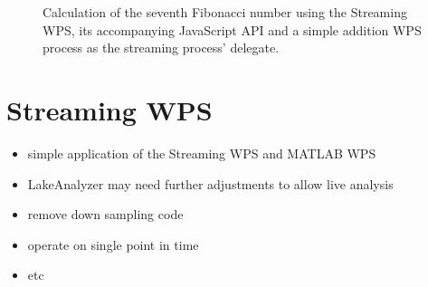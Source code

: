 \begin{figure}
\begin{subfigure}{\textwidth}
			\end{subfigure}
			\caption{\label{fig:client}Calculation of the seventh Fibonacci number using the Streaming WPS, its accompanying JavaScript API and a simple addition WPS process as the streaming process' delegate.}
		\end{figure}
	\section{Streaming \la WPS}
	\begin{itemize}
		\item simple application of the Streaming WPS and MATLAB WPS
		\item LakeAnalyzer may need further adjustments to allow live analysis
		\item remove down sampling code
		\item operate on single point in time
		\item etc
	\end{itemize}

